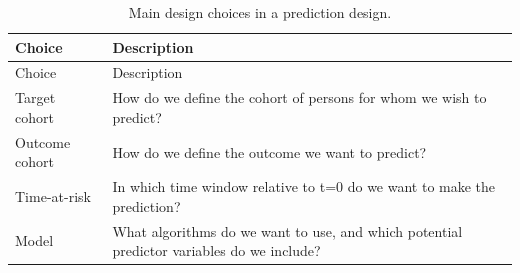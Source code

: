\documentclass[11pt]{book}
\theoremstyle{definition}
\theoremstyle{definition}
\theoremstyle{definition}
\theoremstyle{remark}
\begin{document}
\begin{longtable}[]{@{}ll@{}}
\caption{\label{tab:plpDesign} Main design choices in a prediction design.}\tabularnewline
\toprule
\begin{minipage}[b]{0.23\columnwidth}\raggedright
Choice\strut
\end{minipage} & \begin{minipage}[b]{0.72\columnwidth}\raggedright
Description\strut
\end{minipage}\tabularnewline
\midrule
\endfirsthead
\toprule
\begin{minipage}[b]{0.23\columnwidth}\raggedright
Choice\strut
\end{minipage} & \begin{minipage}[b]{0.72\columnwidth}\raggedright
Description\strut
\end{minipage}\tabularnewline
\midrule
\endhead
\begin{minipage}[t]{0.23\columnwidth}\raggedright
Target cohort\strut
\end{minipage} & \begin{minipage}[t]{0.72\columnwidth}\raggedright
How do we define the cohort of persons for whom we wish to predict?\strut
\end{minipage}\tabularnewline
\begin{minipage}[t]{0.23\columnwidth}\raggedright
Outcome cohort\strut
\end{minipage} & \begin{minipage}[t]{0.72\columnwidth}\raggedright
How do we define the outcome we want to predict?\strut
\end{minipage}\tabularnewline
\begin{minipage}[t]{0.23\columnwidth}\raggedright
Time-at-risk\strut
\end{minipage} & \begin{minipage}[t]{0.72\columnwidth}\raggedright
In which time window relative to t=0 do we want to make the prediction?\strut
\end{minipage}\tabularnewline
\begin{minipage}[t]{0.23\columnwidth}\raggedright
Model\strut
\end{minipage} & \begin{minipage}[t]{0.72\columnwidth}\raggedright
What algorithms do we want to use, and which potential predictor variables do we include?\strut
\end{minipage}\tabularnewline
\bottomrule
\end{longtable}
\end{document}
